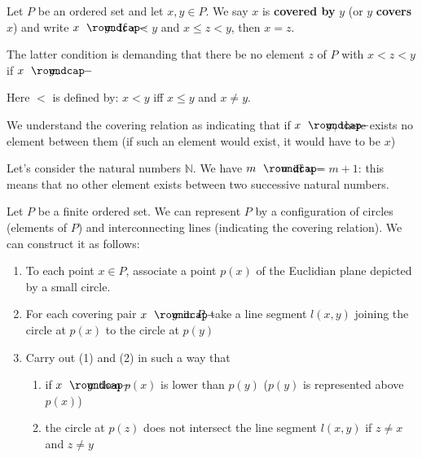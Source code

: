 \begin{definition}
	Let $P$ be an ordered set and let $x,y \in P$. We say $x$ is \textbf{covered by} $y$ (or $y$ \textbf{covers} $x$) and write $x \coveringB y$. If $x < y$ and $x \leq z < y$, then $x = z$.

	The latter condition is demanding that there be no element $z$ of $P$ with $x < z < y$ if $x \coveringB y$.
\end{definition}

\begin{remark}
	Here $<$ is defined by: $x < y$ iff $x \leq y$ and $x \neq y$.
\end{remark}

\begin{remark}
	We understand the covering relation as indicating that if $x \coveringB y$, there exists no element between them (if such an element would exist, it would have to be $x$)
\end{remark}

\begin{example}
    Let's consider the natural numbers $\mathbb{N}$. We have $m \coveringB n$ iff $n = m+1$: this means that no other element exists between two successive natural numbers.
\end{example}

\begin{definition}
	Let $P$ be a finite ordered set. We can represent $P$ by a configuration of circles (elements of $P$) and interconnecting lines (indicating the covering relation). We can construct it as follows:
    \begin{enumerate}
    \item To each point $x \in P$, associate a point $p(x)$ of the Euclidian plane depicted by a small circle.
    \item For each covering pair $x \coveringB y$ in $P$, take a line segment $l(x,y)$ joining the circle at $p(x)$ to the circle at $p(y)$
    \item Carry out (1) and (2) in such a way that
          \begin{enumerate}
          \item if $x \coveringB y$ then $p(x)$ is lower than $p(y)$ ($p(y)$ is represented above $p(x)$)
          \item the circle at $p(z)$ does not intersect the line segment $l(x,y)$ if $z \neq x$ and $z \neq y$
          \end{enumerate}
    \end{enumerate}
\end{definition}

